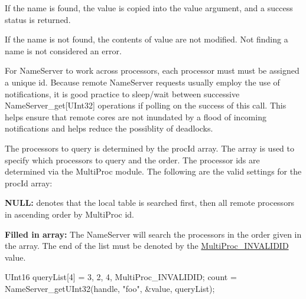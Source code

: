 If the name is found, the value is copied into the value argument, and a success status is returned.

If the name is not found, the contents of value are not modified. Not finding a name is not considered an error.

For NameServer to work across processors, each processor must must be assigned a unique id. Because remote NameServer requests usually employ the use of notifications, it is good practice to sleep/wait between successive NameServer\_\-get\mbox{[}UInt32\mbox{]} operations if polling on the success of this call. This helps ensure that remote cores are not inundated by a flood of incoming notifications and helps reduce the possiblity of deadlocks.

The processors to query is determined by the procId array. The array is used to specify which processors to query and the order. The processor ids are determined via the MultiProc module. The following are the valid settings for the procId array: \begin{DoxyItemize}
\item {\bfseries NULL:} denotes that the local table is searched first, then all remote processors in ascending order by MultiProc id. \item {\bfseries Filled in array:} The NameServer will search the processors in the order given in the array. The end of the list must be denoted by the \hyperlink{_multi_proc_8h_a94a1d14527833bc8294407634d5495d9}{MultiProc\_\-INVALIDID} value.\end{DoxyItemize}

\begin{DoxyCode}
  UInt16 queryList[4] = {3, 2, 4, MultiProc_INVALIDID};
  count = NameServer_getUInt32(handle, "foo", &value, queryList);
\end{DoxyCode}


